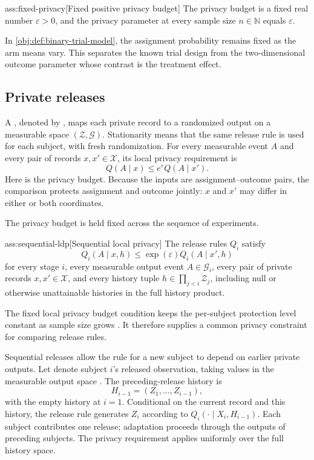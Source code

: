 \documentclass[11pt]{article}
\begin{document}
\begin{assumptionv}{ass:fixed-privacy}[Fixed positive privacy budget]
The privacy budget is a fixed real number \(\varepsilon>0\), and the privacy parameter at every sample size \(n\in\mathbb{N}\) equals \(\varepsilon\).
\end{assumptionv}

In \cref{obj:def:binary-trial-model}, the assignment probability remains fixed as the arm means vary. This separates the known trial design from the two-dimensional outcome parameter whose contrast is the treatment effect.

\subsection{Private releases}

A , denoted by , maps each private record to a randomized output on a measurable space \((\mathcal Z,\mathcal G)\). Stationarity means that the same release rule is used for each subject, with fresh randomization. For every measurable event \(A\) and every pair of records \(x,x'\in\mathcal X\), its local privacy requirement is
\[
Q(A\mid x)\le e^\varepsilon Q(A\mid x').
\]
Here  is the privacy budget. Because the inputs are assignment--outcome pairs, the comparison protects assignment and outcome jointly: \(x\) and \(x'\) may differ in either or both coordinates.

The privacy budget is held fixed across the sequence of experiments.

\begin{assumptionv}{ass:sequential-ldp}[Sequential local privacy]
The release rules \(Q_i\) satisfy
\[
Q_i(A\mid x,h)\le \exp(\varepsilon)Q_i(A\mid x',h)
\]
for every stage \(i\), every measurable output event \(A\in\mathcal G_i\), every pair of private records \(x,x'\in\mathcal X\), and every history tuple \(h\in\prod_{j<i}\mathcal Z_j\), including null or otherwise unattainable histories in the full history product.
\end{assumptionv}

The fixed local privacy budget condition keeps the per-subject protection level constant as sample size grows \citep{Steinberger2024}. It therefore supplies a common privacy constraint for comparing release rules.

Sequential releases allow the rule for a new subject to depend on earlier private outputs. Let  denote subject \(i\)'s released observation, taking values in the measurable output space . The preceding-release history  is
\[
H_{i-1}=(Z_1,\ldots,Z_{i-1}),
\]
with the empty history at \(i=1\). Conditional on the current record and this history, the release rule  generates \(Z_i\) according to \(Q_i(\cdot\mid X_i,H_{i-1})\). Each subject contributes one release; adaptation proceeds through the outputs of preceding subjects. The privacy requirement applies uniformly over the full history space.
\end{document}
